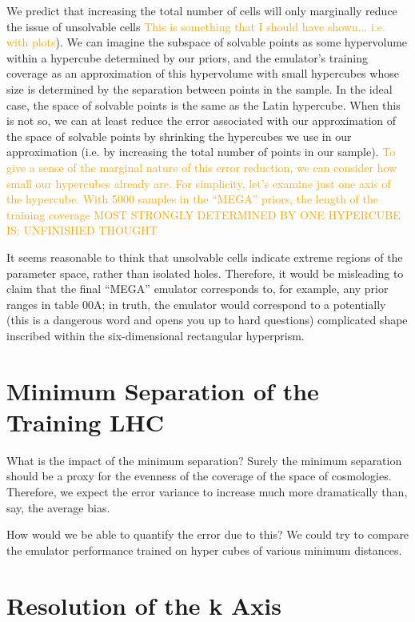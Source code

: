 We predict that increasing the total number of cells will only marginally
reduce the issue of unsolvable cells \textcolor{orange}{This is something that 
I should have shown... i.e. with plots}). We can imagine the subspace of
solvable points as some hypervolume within a hypercube determined by our
priors, and the emulator's training coverage as an approximation of this 
hypervolume with small hypercubes whose size is determined by the separation 
between points in the sample. In the ideal case, the space of solvable points 
is the same as the Latin hypercube. When this is not so, we can at least
reduce the error associated with our approximation of the space of solvable
points by shrinking the hypercubes we use in our approximation (i.e. by
increasing the total number of points in our sample). \textcolor{orange}{
To give a sense of the marginal nature of this error reduction, we can
consider how small our hypercubes already are. For simplicity, let's examine
just one axis of the hypercube. With 5000 samples in the ``MEGA'' priors,
the length of the training coverage MOST STRONGLY DETERMINED BY ONE HYPERCUBE
IS: UNFINISHED THOUGHT}

It seems reasonable to think that unsolvable cells indicate extreme regions of 
the parameter space, rather than isolated holes. Therefore, it would be 
misleading to claim that the final ``MEGA'' emulator corresponds to, for 
example, any prior ranges in table 00A; in truth, the emulator would 
correspond to a potentially (this is a dangerous word and opens you up to hard 
questions) complicated shape inscribed within the six-dimensional rectangular 
hyperprism.

\section{Minimum Separation of the Training LHC}
\label{sec: error_from_lhc}

What is the impact of the minimum separation? Surely the minimum separation
should be a proxy for the evenness of the coverage of the space of
cosmologies. Therefore, we expect the error variance to increase much more
dramatically than, say, the average bias.

How would we
be able to quantify the error due to this? We could try to compare the
emulator performance trained on hyper cubes of various minimum distances.

\section{Resolution of the k Axis}

